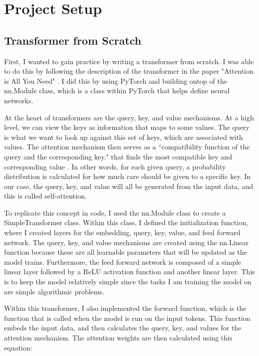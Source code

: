 \documentclass{article}
\begin{document}
\section{Project Setup}

\subsection{Transformer from Scratch}

First, I wanted to gain practice by writing a transformer from scratch. I was able to do this by following the description of the transformer in the paper "Attention is All You Need" \cite{7}. I did this by using PyTorch and building ontop of the nn.Module class, which is a class within PyTorch that helps define neural networks. 

At the heart of transformers are the query, key, and value mechanisms. At a high level, we can view the keys as information that maps to some values. The query is what we want to look up against this set of keys, which are associated with values. The attention mechanism then serves as a ``compatibility function of the query and the corresponding key." that finds the most compatible key and corresponding value \cite{7}. In other words, for each given query, a probability distribution is calculated for how much care should be given to a specific key. In our case, the query, key, and value will all be generated from the input data, and this is called self-attention. 

To replicate this concept in code, I used the nn.Module class to create a SimpleTransformer class. Within this class, I defined the initialization function,
where I created layers for the embedding, query, key, value, and feed forward network. The query, key, and value mechanisms are created using the nn.Linear function because these are all learnable parameters that will be updated as the model trains. Furthermore, the feed forward network is composed of a simple linear layer followed by a ReLU activation function and another linear layer. This is to keep the model relatively simple since the tasks I am training the model on are simple algorithmic problems.

Within this transformer, I also implemented the forward function, which is the function that is called when the model is run on the input tokens. This function embeds the input data, and then calculates the query, key, and values for the attention mechanism. The attention weights are then calculated using this equation:
\end{document}
